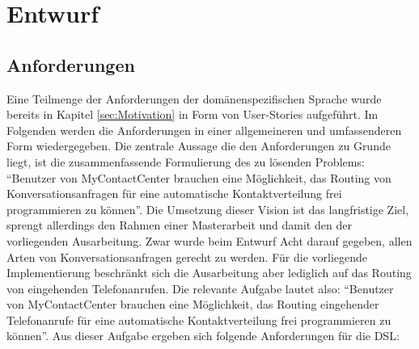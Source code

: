 \chapter{Entwurf}
\label{chap:Entwurf}

\section{Anforderungen}
Eine Teilmenge der Anforderungen der domänenspezifischen Sprache wurde bereits in Kapitel \ref{sec:Motivation} in Form von User-Stories aufgeführt. Im Folgenden werden die Anforderungen in einer allgemeineren und umfassenderen Form wiedergegeben. Die zentrale Aussage die den Anforderungen zu Grunde liegt, ist die zusammenfassende Formulierung des zu lösenden Problems: ``Benutzer von MyContactCenter brauchen eine Möglichkeit, das Routing von Konversationsanfragen für eine automatische Kontaktverteilung frei programmieren zu können''. Die Umsetzung dieser Vision ist das langfristige Ziel, sprengt allerdings den Rahmen einer Masterarbeit und damit den der vorliegenden Ausarbeitung. Zwar wurde beim Entwurf Acht darauf gegeben, allen Arten von Konversationsanfragen gerecht zu werden. Für die vorliegende Implementierung beschränkt sich die Ausarbeitung aber lediglich auf das Routing von eingehenden Telefonanrufen. Die relevante Aufgabe lautet also: ``Benutzer von MyContactCenter brauchen eine Möglichkeit, das Routing eingehender Telefonanrufe für eine automatische Kontaktverteilung frei programmieren zu können''.
\newline
Aus dieser Aufgabe ergeben sich folgende Anforderungen für die DSL:
